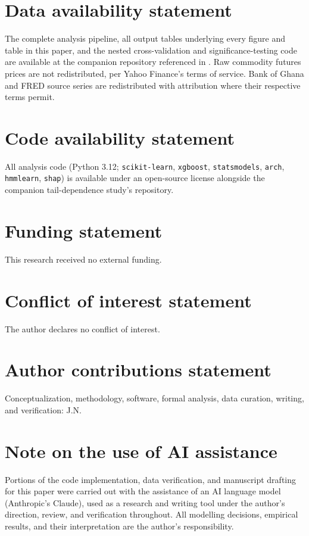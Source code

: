 \documentclass[final,3p,times,authoryear]{elsarticle}
\begin{document}
\section*{Data availability statement}
The complete analysis pipeline, all output tables underlying every
figure and table in this paper, and the nested cross-validation and
significance-testing code are available at the companion repository
referenced in \citet{nelson2026tail}. Raw commodity futures prices are
not redistributed, per Yahoo Finance's terms of service. Bank of Ghana
and FRED source series are redistributed with attribution where their
respective terms permit.

\section*{Code availability statement}
All analysis code (Python 3.12; \texttt{scikit-learn}, \texttt{xgboost},
\texttt{statsmodels}, \texttt{arch}, \texttt{hmmlearn}, \texttt{shap})
is available under an open-source license alongside the companion
tail-dependence study's repository.

\section*{Funding statement}
This research received no external funding.

\section*{Conflict of interest statement}
The author declares no conflict of interest.

\section*{Author contributions statement}
Conceptualization, methodology, software, formal analysis, data
curation, writing, and verification: J.N.

\section*{Note on the use of AI assistance}
Portions of the code implementation, data verification, and manuscript
drafting for this paper were carried out with the assistance of an AI
language model (Anthropic's Claude), used as a research and writing
tool under the author's direction, review, and verification throughout.
All modelling decisions, empirical results, and their interpretation
are the author's responsibility.
\end{document}
